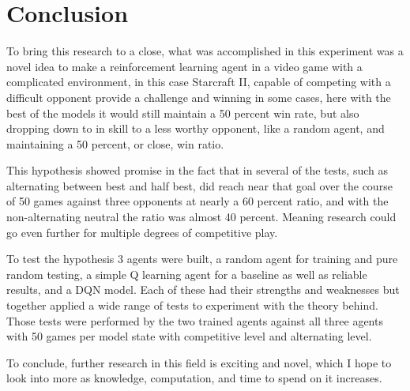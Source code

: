 \section{Conclusion}
\label{sec:conclusion}


To bring this research to a close, what was accomplished in this experiment was a novel idea to make a reinforcement learning agent in a video game with a complicated environment, in this case Starcraft II, capable of competing with a difficult opponent provide a
challenge and winning in some cases, here with the best of the models it would still maintain a 50 percent win rate, but also dropping down to in skill to a less worthy opponent, like a random agent, and maintaining a 50 percent, or close, win ratio. 

This hypothesis showed promise in the fact that in several of the tests, such as alternating between best and half best, did reach near that goal over the course of 50 games against three opponents at nearly a 60 percent ratio, and with the non-alternating neutral 
the ratio was almost 40 percent. Meaning research could go even further for multiple degrees of competitive play. 

To test the hypothesis 3 agents were built, a random agent for training and pure random testing, a simple Q learning agent for a baseline as well as reliable results, and a DQN model. Each of these had their strengths and weaknesses but together applied a wide 
range of tests to experiment with the theory behind. Those tests were performed by the two trained agents against all three agents with 50 games per model state with competitive level and alternating level. 

To conclude, further research in this field is exciting and novel, which I hope to look into more as knowledge, computation, and time to spend on it increases. 